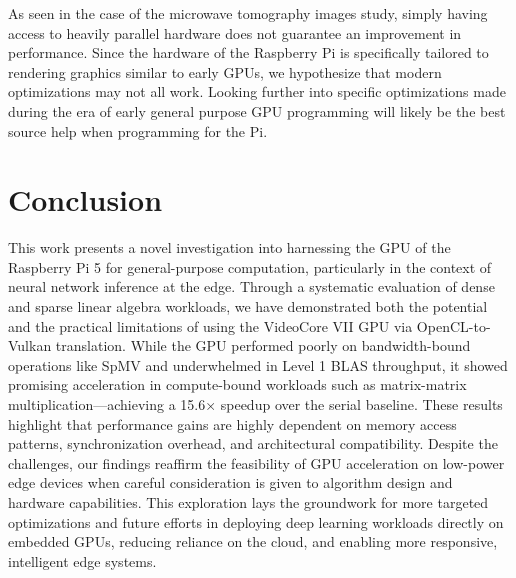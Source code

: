 \documentclass[conference]{IEEEtran}
\begin{document}
 As seen in the case of the microwave tomography images study, simply having access to heavily parallel hardware 
 does not guarantee an improvement in performance. Since the hardware of the Raspberry Pi is specifically tailored 
 to rendering graphics similar to early GPUs, we hypothesize that modern optimizations may not all work. 
 Looking further into specific optimizations made during the era of early general purpose GPU programming will likely
 be the best source help when programming for the Pi. 


 \section{Conclusion}

This work presents a novel investigation into harnessing the GPU of the Raspberry Pi 5 for general-purpose 
computation, particularly in the context of neural network inference at the edge. Through a systematic evaluation of 
dense and sparse linear algebra workloads, we have demonstrated both the potential and the practical limitations of 
using the VideoCore VII GPU via OpenCL-to-Vulkan translation. While the GPU performed poorly on bandwidth-bound operations 
like SpMV and underwhelmed in Level 1 BLAS throughput, it showed promising acceleration in compute-bound workloads such as 
matrix-matrix multiplication—achieving a 15.6× speedup over the serial baseline. These results highlight that performance 
gains are highly dependent on memory access patterns, synchronization overhead, and architectural compatibility. Despite 
the challenges, our findings reaffirm the feasibility of GPU acceleration on low-power edge devices when careful consideration 
is given to algorithm design and hardware capabilities. This exploration lays the groundwork for more targeted optimizations 
and future efforts in deploying deep learning workloads directly on embedded GPUs, reducing reliance on the cloud, and enabling 
more responsive, intelligent edge systems.
 
 
 
 
 \vspace{12pt}
 
 
\end{document}
